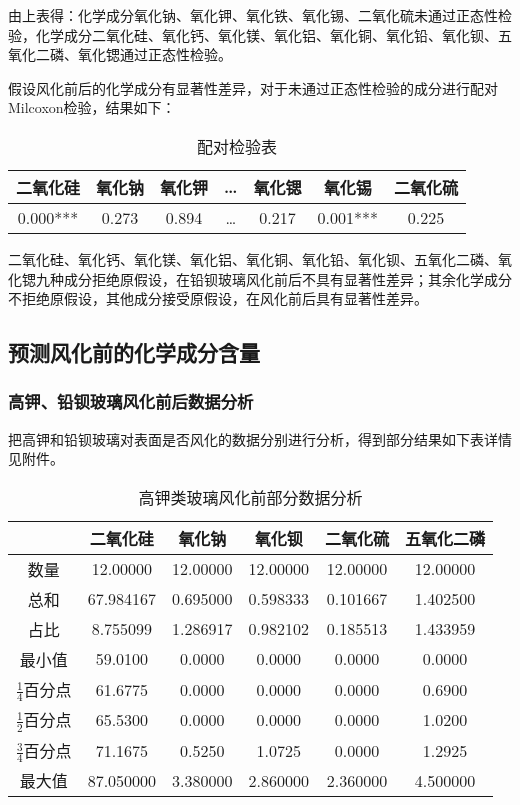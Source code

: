 由上表得：化学成分氧化钠、氧化钾、氧化铁、氧化锡、二氧化硫未通过正态性检验，化学成分二氧化硅、氧化钙、氧化镁、氧化铝、氧化铜、氧化铅、氧化钡、五氧化二磷、氧化锶通过正态性检验。

假设风化前后的化学成分有显著性差异，对于未通过正态性检验的成分进行配对Milcoxon检验，结果如下：

\begin{table}[H]
	\centering
	\begin{tabular}{c c c c c c c} 
		\toprule[1.5pt]
		二氧化硅 &	氧化钠 & 氧化钾 &	… &	氧化锶 & 氧化锡 & 二氧化硫 \\
		\midrule[1pt]
		0.000*** & 0.273 & 0.894 & … & 0.217 & 0.001*** & 0.225 \\
		\toprule[1.5pt]
	\end{tabular}
\caption{配对检验表}
\end{table}

二氧化硅、氧化钙、氧化镁、氧化铝、氧化铜、氧化铅、氧化钡、五氧化二磷、氧化锶九种成分拒绝原假设，在铅钡玻璃风化前后不具有显著性差异；其余化学成分不拒绝原假设，其他成分接受原假设，在风化前后具有显著性差异。


\subsection{预测风化前的化学成分含量}

\subsubsection{高钾、铅钡玻璃风化前后数据分析}

把高钾和铅钡玻璃对表面是否风化的数据分别进行分析，得到部分结果如下表详情见附件。

\begin{table}[H]
	\centering
	\begin{tabular}{c c c c c c} 
        \toprule[1.5pt]
		 & 二氧化硅 & 氧化钠 & 氧化钡 & 二氧化硫	& 五氧化二磷 \\
        \midrule[1pt]
		数量 & 12.00000 & 12.00000 & 12.00000 & 12.00000 & 12.00000 \\
		总和 & 67.984167 & 0.695000 & 0.598333 & 0.101667 & 1.402500 \\
		占比 & 8.755099 &	1.286917 & 0.982102 & 0.185513 & 1.433959 \\
		最小值	& 59.0100 & 0.0000 & 0.0000 & 0.0000 & 0.0000 \\
		$\frac{1}{4}$百分点 & 61.6775 & 0.0000 & 0.0000 & 0.0000 &	0.6900 \\
		$\frac{1}{2}$百分点 & 65.5300 & 0.0000 & 0.0000 & 0.0000 & 1.0200 \\
		$\frac{3}{4}$百分点 &  71.1675 & 0.5250 & 1.0725 &	0.0000 &	1.2925 \\
		最大值 & 87.050000 & 3.380000 & 2.860000 & 2.360000 & 4.500000 \\
		\toprule[1.5pt]
	\end{tabular}
\caption{高钾类玻璃风化前部分数据分析}
\end{table}


